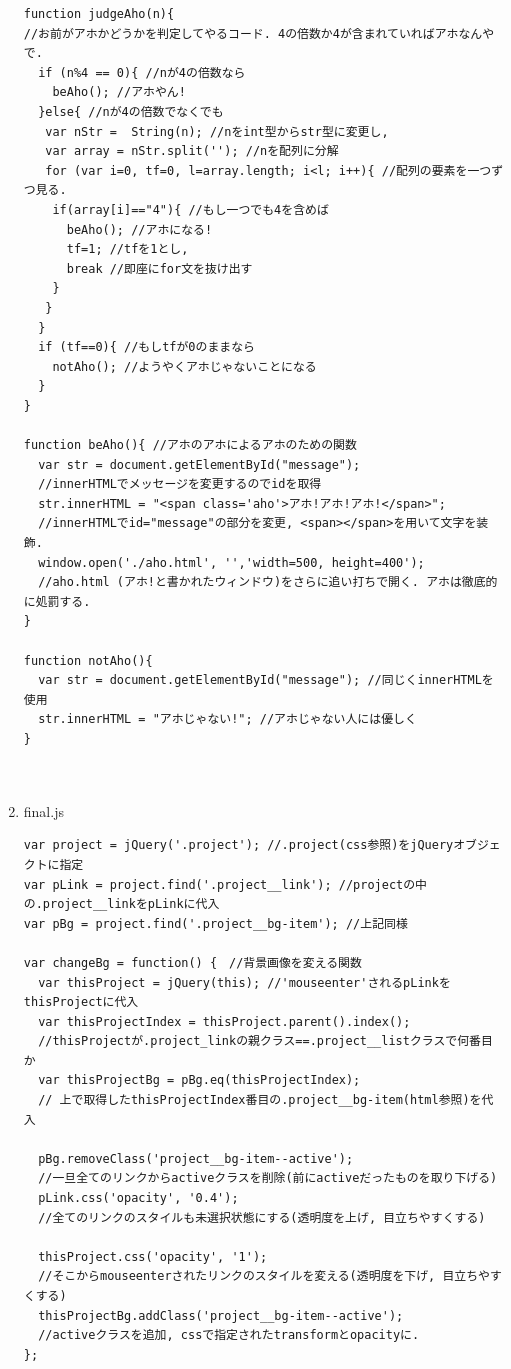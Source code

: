 \documentclass{jarticle}
\begin{document}
\begin{enumerate}
\begin{lstlisting}[basicstyle=\ttfamily\footnotesize,frame=single]
function judgeAho(n){ 
//お前がアホかどうかを判定してやるコード. 4の倍数か4が含まれていればアホなんやで.
  if (n%4 == 0){ //nが4の倍数なら
    beAho(); //アホやん!
  }else{ //nが4の倍数でなくでも
   var nStr =  String(n); //nをint型からstr型に変更し, 
   var array = nStr.split(''); //nを配列に分解
   for (var i=0, tf=0, l=array.length; i<l; i++){ //配列の要素を一つずつ見る.
    if(array[i]=="4"){ //もし一つでも4を含めば
      beAho(); //アホになる!
      tf=1; //tfを1とし, 
      break //即座にfor文を抜け出す
    }
   }
  }
  if (tf==0){ //もしtfが0のままなら
    notAho(); //ようやくアホじゃないことになる
  }
}

function beAho(){ //アホのアホによるアホのための関数
  var str = document.getElementById("message"); 
  //innerHTMLでメッセージを変更するのでidを取得
  str.innerHTML = "<span class='aho'>アホ!アホ!アホ!</span>"; 
  //innerHTMLでid="message"の部分を変更, <span></span>を用いて文字を装飾.
  window.open('./aho.html', '','width=500, height=400'); 
  //aho.html (アホ!と書かれたウィンドウ)をさらに追い打ちで開く. アホは徹底的に処罰する.
}

function notAho(){
  var str = document.getElementById("message"); //同じくinnerHTMLを使用
  str.innerHTML = "アホじゃない!"; //アホじゃない人には優しく
}



		\end{lstlisting}
	\item final.js
		\begin{lstlisting}[basicstyle=\ttfamily\footnotesize,frame=single]
var project = jQuery('.project'); //.project(css参照)をjQueryオブジェクトに指定
var pLink = project.find('.project__link'); //projectの中の.project__linkをpLinkに代入
var pBg = project.find('.project__bg-item'); //上記同様

var changeBg = function() {　//背景画像を変える関数
  var thisProject = jQuery(this); //'mouseenter'されるpLinkをthisProjectに代入
  var thisProjectIndex = thisProject.parent().index();
  //thisProjectが.project_linkの親クラス==.project__listクラスで何番目か
  var thisProjectBg = pBg.eq(thisProjectIndex);
  // 上で取得したthisProjectIndex番目の.project__bg-item(html参照)を代入
  
  pBg.removeClass('project__bg-item--active');
  //一旦全てのリンクからactiveクラスを削除(前にactiveだったものを取り下げる)
  pLink.css('opacity', '0.4');
  //全てのリンクのスタイルも未選択状態にする(透明度を上げ, 目立ちやすくする)
  
  thisProject.css('opacity', '1'); 
  //そこからmouseenterされたリンクのスタイルを変える(透明度を下げ, 目立ちやすくする)
  thisProjectBg.addClass('project__bg-item--active');
  //activeクラスを追加, cssで指定されたtransformとopacityに.
};


\end{lstlisting}
\end{enumerate}
\end{document}
